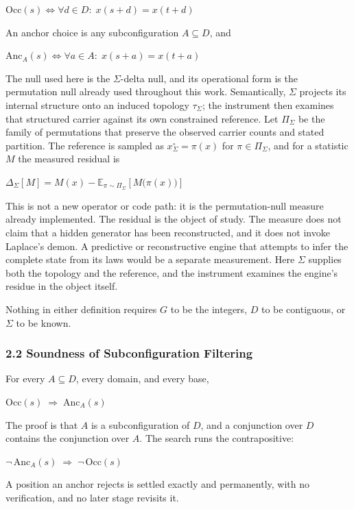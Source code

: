 \(\mathrm{Occ}(s) \iff \forall d \in D:\; x(s+d) = x(t+d)\)

An anchor choice is any subconfiguration \(A \subseteq D\), and

\(\mathrm{Anc}_A(s) \iff \forall a \in A:\; x(s+a) = x(t+a)\)

The null used here is the \(\Sigma\)-delta null, and its operational form is the permutation null already used throughout this work. Semantically, \(\Sigma\) projects its internal structure onto an induced topology \(\tau_\Sigma\); the instrument then examines that structured carrier against its own constrained reference. Let \(\Pi_\Sigma\) be the family of permutations that preserve the observed carrier counts and stated partition. The reference is sampled as \(x^\circ_\Sigma = \pi(x)\) for \(\pi \in \Pi_\Sigma\), and for a statistic \(M\) the measured residual is

\(\Delta_\Sigma[M] = M(x) - \mathbb{E}_{\pi \sim \Pi_\Sigma}\!\left[M\bigl(\pi(x)\bigr)\right]\)

This is not a new operator or code path: it is the permutation-null measure already implemented. The residual is the object of study. The measure does not claim that a hidden generator has been reconstructed, and it does not invoke Laplace's demon. A predictive or reconstructive engine that attempts to infer the complete state from its laws would be a separate measurement. Here \(\Sigma\) supplies both the topology and the reference, and the instrument examines the engine's residue in the object itself.

Nothing in either definition requires \(G\) to be the integers, \(D\) to be contiguous, or \(\Sigma\) to be known.

\subsubsection{2.2 Soundness of Subconfiguration Filtering}

For every \(A \subseteq D\), every domain, and every base,

\(\mathrm{Occ}(s) \;\Longrightarrow\; \mathrm{Anc}_A(s)\)

The proof is that \(A\) is a subconfiguration of \(D\), and a conjunction over \(D\) contains the conjunction over \(A\). The search runs the contrapositive:

\(\neg\,\mathrm{Anc}_A(s) \;\Longrightarrow\; \neg\,\mathrm{Occ}(s)\)

A position an anchor rejects is settled exactly and permanently, with no verification, and no later stage revisits it.

